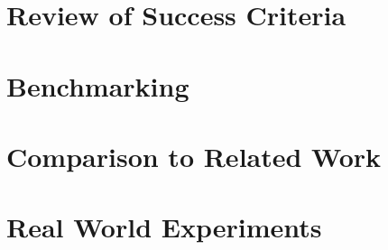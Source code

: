 

\label{sec:4}

\section{Review of Success Criteria}
\label{sec:review-of-success-criteria}

\section{Benchmarking}
\label{sec:benchmarking}

\section{Comparison to Related Work}
\label{sec:comparison-to-related-work}



\section{Real World Experiments}
\label{sec:real-world-experiments}


